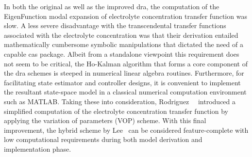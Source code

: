 In both the original  as well as the improved \gls{dra},  the computation of the
EigenFunction modal expansion of electrolyte concentration transfer function was
slow.  A less  severe disadvantage  with the  transcendental transfer  functions
associated with the electrolyte concentration was that their derivation entailed
mathematically cumbersome  symbolic manipulations  that dictated  the need  of a
capable \gls{cas} package.  Albeit from a standalone  viewpoint this requirement
does  not  seem to  be  critical,  the Ho-Kalman  algorithm  that  forms a  core
component  of the  \gls{dra}  schemes  is steeped  in  numerical linear  algebra
routines. Furthermore, for facilitating  state estimator and controller designs,
it is  convenient to implement  the resultant  state-space model in  a classical
numerical  computation environment  such as  \textsc{MATLAB}. Taking  these into
consideration,  Rodriguez~\etal{}~\cite{Rodriguez2017}  introduced a  simplified
computation of the  electrolyte concentration transfer function  by applying the
variation of  parameters (VOP) scheme.  With this final improvement,  the hybrid
scheme by Lee~\etal{}  can be considered feature-complete  with low computational
requirements during both model derivation and implementation phase.


